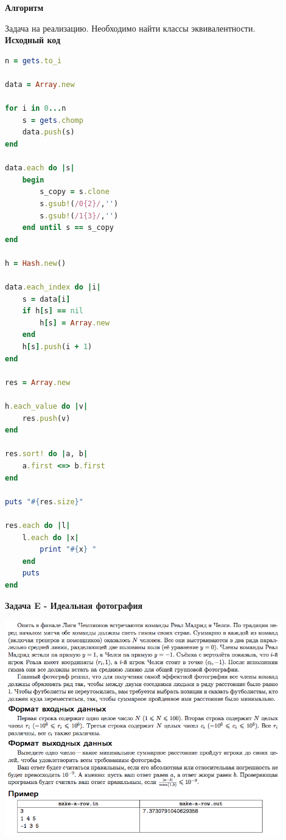 \documentclass[a4paper,12pt]{article}
\begin{document}
\textbf{{\large Алгоритм}}

Задача на реализацию. Необходимо найти классы эквивалентности. \\

\textbf{{\large Исходный код}} \\
\begin{lstlisting}[language=Ruby]
n = gets.to_i

data = Array.new

for i in 0...n
    s = gets.chomp
    data.push(s)
end

data.each do |s|
    begin
        s_copy = s.clone
        s.gsub!(/0{2}/,'')
        s.gsub!(/1{3}/,'')
    end until s == s_copy
end

h = Hash.new()

data.each_index do |i|
    s = data[i]
    if h[s] == nil
        h[s] = Array.new
    end
    h[s].push(i + 1)
end

res = Array.new

h.each_value do |v|
    res.push(v)
end

res.sort! do |a, b|
    a.first <=> b.first
end

puts "#{res.size}"

res.each do |l|
    l.each do |x|
        print "#{x} "
    end
    puts
end

\end{lstlisting}

\newpage
\textbf{{\large Задача E - Идеальная фотография}}

\begin{center}
\includegraphics[width=0.9\textwidth]{OC_Peterhof/E.png}\\ [1cm]
\end{center}
\end{document}

